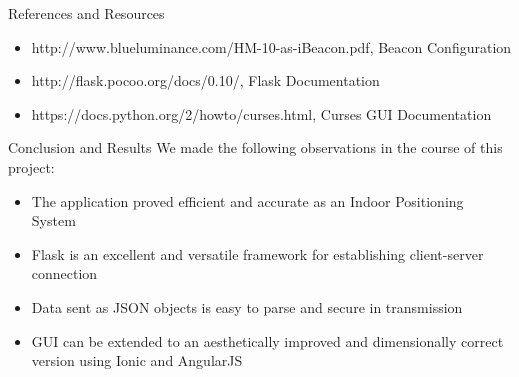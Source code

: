 \documentclass[final]{beamer}
\newlength{\onecolwid}
\begin{document}
\begin{frame}[t]
\begin{columns}[t]
\begin{column}{\onecolwid}

\begin{block}{References and Resources}

\nocite{*} %
\begin{itemize}
\item http://www.blueluminance.com/HM-10-as-iBeacon.pdf, Beacon Configuration
\item http://flask.pocoo.org/docs/0.10/, Flask Documentation
\item https://docs.python.org/2/howto/curses.html, Curses GUI Documentation
\end{itemize}

\end{block}


\begin{alertblock}{Conclusion and Results}
We made the following observations in the course of this project:
\begin{itemize}
\item The application proved efficient and accurate as an Indoor Positioning System
\item Flask is an excellent and versatile framework for establishing client-server connection
\item Data sent as JSON objects is easy to parse and secure in transmission 
\item GUI can be extended to an aesthetically improved and dimensionally correct version using Ionic and AngularJS 
\end{itemize}

\end{alertblock}



\end{column} %

\end{columns} %

\end{frame} %
\end{document}
